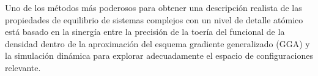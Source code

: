 Uno de los m\'etodos m\'as poderosos para obtener una descripci\'on
realista de las propiedades de equilibrio de sistemas complejos con
un nivel de detalle at\'omico est\'a basado en la sinerg\'ia entre la
precisi\'on de la toer\'ia del funcional de la densidad dentro de la
aproximaci\'on del esquema gradiente generalizado (GGA) y la 
simulaci\'on din\'amica para explorar adecuadamente el espacio de 
configuraciones relevante.
